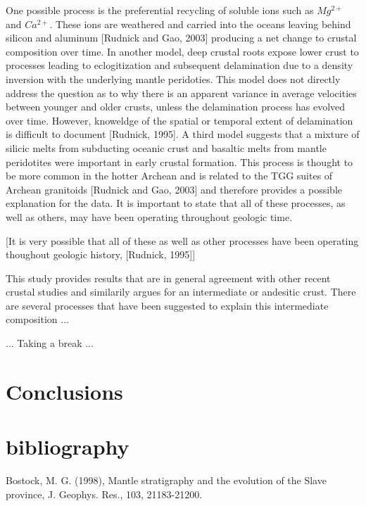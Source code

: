 \documentclass[draft, 12pt]{article}
\begin{document}
One possible process is the preferential recycling of soluble ions such as $Mg^{2+}$ and $Ca^{2+}$. These ions are weathered and carried into the oceans leaving behind silicon and aluminum [Rudnick and Gao, 2003] producing a net change to crustal composition over time. In another model, deep crustal roots expose lower crust to processes leading to eclogitization and subsequent delamination due to a density inversion with the underlying mantle peridoties. This model does not directly address the question as to why there is an apparent variance in average velocities between younger and older crusts, unless the delamination process has evolved over time. However, knoweldge of the spatial or temporal extent of delamination is difficult to document [Rudnick, 1995]. A third model suggests that a mixture of silicic melts from subducting oceanic crust and basaltic melts from mantle peridotites were important in early crustal formation. This process is thought to be more common in the hotter Archean and is related to the TGG suites of Archean granitoids [Rudnick and Gao, 2003] and therefore provides a possible explanation for the data. It is important to state that all of these processes, as well as others, may have been operating throughout geologic time.

[It is very possible that all of these as well as other processes have been operating thoughout geologic history, [Rudnick, 1995]]

This study provides results that are in general agreement with other recent crustal studies and similarily argues for an intermediate or andesitic crust. There are several processes that have been suggested to explain this intermediate composition ...

... Taking a break ...



\section{Conclusions}



\section{bibliography}

Bostock, M. G. (1998), Mantle stratigraphy and the evolution of the Slave province, J. Geophys. Res., 103, 21183-21200.
\end{document}

